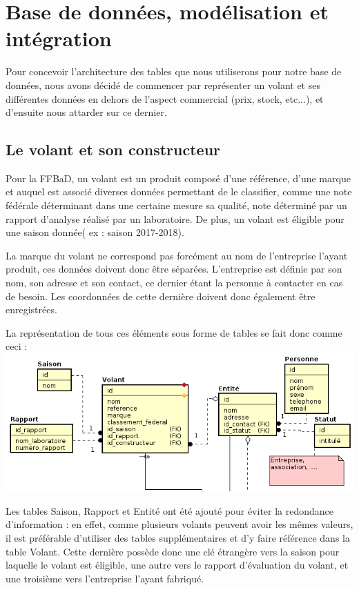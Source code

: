 \documentclass[french,a4paper,12pt]{report}
\begin{document}
\chapter{Base de données, modélisation et intégration}
Pour concevoir l'architecture des tables que nous utiliserons pour notre base
de données, nous avons décidé de commencer par représenter un volant et ses
différentes données en dehors de l'aspect commercial (prix, stock, etc...),
et d'ensuite nous attarder sur ce dernier.

\section{Le volant et son constructeur}
Pour la FFBaD, un volant est un produit composé d'une référence, d'une marque
et auquel est associé diverses données permettant de le classifier, comme une
note fédérale déterminant dans une certaine mesure sa qualité, note déterminé
par un rapport d'analyse réalisé par un laboratoire. De plus, un volant est
éligible pour une saison donnée( ex : saison 2017-2018).

La marque du volant ne correspond pas forcément au nom de l'entreprise l'ayant
produit, ces données doivent donc être séparées. L'entreprise est définie par
son nom, son adresse et son contact, ce dernier étant la personne à contacter
en cas de besoin. Les coordonnées de cette dernière doivent donc également être
 enregistrées.

La représentation de tous ces éléments sous forme de tables se fait donc comme
ceci :
\centering
\includegraphics[width=15cm]{ensemble1.png}

Les tables Saison, Rapport et Entité ont été ajouté pour éviter la redondance
d'information : en effet, comme plusieurs volants peuvent avoir les mêmes
valeurs, il est préférable d'utiliser des tables supplémentaires et d'y faire
référence dans la table Volant. Cette dernière possède donc une clé étrangère
vers la saison pour laquelle le volant est éligible, une autre vers le rapport
d'évaluation du volant, et une troisième vers l'entreprise l'ayant fabriqué.
\end{document}
